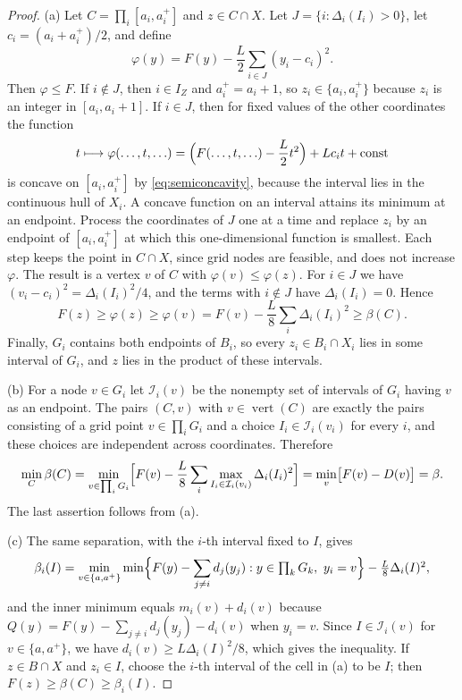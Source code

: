 \begin{proof}
(a) Let $C=\prod_i[a_i,a_i^+]$ and $z\in C\cap X$. Let
$J=\{i:\Delta_i(I_i)>0\}$, let $c_i=(a_i+a_i^+)/2$, and define
\[
\varphi(y)=F(y)-\frac L2\sum_{i\in J}(y_i-c_i)^2 .
\]
Then $\varphi\le F$. If $i\notin J$, then $i\in I_Z$ and $a_i^+=a_i+1$, so
$z_i\in\{a_i,a_i^+\}$ because $z_i$ is an integer in $[a_i,a_i+1]$. If
$i\in J$, then for fixed values of the other coordinates the function
\[
t\longmapsto\varphi(\ldots,t,\ldots)
=\Bigl(F(\ldots,t,\ldots)-\frac L2t^2\Bigr)+Lc_it+\text{const}
\]
is concave on $[a_i,a_i^+]$ by \eqref{eq:semiconcavity}, because the
interval lies in the continuous hull of $X_i$. A concave function on an
interval attains its minimum at an endpoint. Process the coordinates of
$J$ one at a time and replace $z_i$ by an endpoint of $[a_i,a_i^+]$ at
which this one-dimensional function is smallest. Each step keeps the point
in $C\cap X$, since grid nodes are feasible, and does not increase
$\varphi$. The result is a vertex $v$ of $C$ with $\varphi(v)\le\varphi(z)$.
For $i\in J$ we have $(v_i-c_i)^2=\Delta_i(I_i)^2/4$, and the terms with
$i\notin J$ have $\Delta_i(I_i)=0$. Hence
\[
F(z)\ge\varphi(z)\ge\varphi(v)=F(v)-\frac L8\sum_i\Delta_i(I_i)^2\ge\beta(C).
\]
Finally, $G_i$ contains both endpoints of $B_i$, so every $z_i\in B_i\cap X_i$
lies in some interval of $G_i$, and $z$ lies in the product of these
intervals.

(b) For a node $v\in G_i$ let $\mathcal I_i(v)$ be the nonempty set of
intervals of $G_i$ having $v$ as an endpoint. The pairs $(C,v)$ with
$v\in\operatorname{vert}(C)$ are exactly the pairs consisting of a grid
point $v\in\prod_iG_i$ and a choice $I_i\in\mathcal I_i(v_i)$ for every
$i$, and these choices are independent across coordinates. Therefore
\[
\min_C\beta(C)
=\min_{v\in\prod_iG_i}\Bigl[F(v)-\frac L8\sum_i
\max_{I_i\in\mathcal I_i(v_i)}\Delta_i(I_i)^2\Bigr]
=\min_{v}\bigl[F(v)-D(v)\bigr]=\beta .
\]
The last assertion follows from (a).

(c) The same separation, with the $i$-th interval fixed to $I$, gives
\[
\beta_i(I)=\min_{v\in\{a,a^+\}}\min\Bigl\{F(y)-\sum_{j\ne i}d_j(y_j):
y\in\textstyle\prod_kG_k,\ y_i=v\Bigr\}-\frac L8\Delta_i(I)^2 ,
\]
and the inner minimum equals $m_i(v)+d_i(v)$ because $Q(y)=F(y)-
\sum_{j\ne i}d_j(y_j)-d_i(v)$ when $y_i=v$. Since $I\in\mathcal I_i(v)$ for
$v\in\{a,a^+\}$, we have $d_i(v)\ge L\Delta_i(I)^2/8$, which gives the
inequality. If $z\in B\cap X$ and $z_i\in I$, choose the $i$-th interval of
the cell in (a) to be $I$; then $F(z)\ge\beta(C)\ge\beta_i(I)$.
\end{proof}

